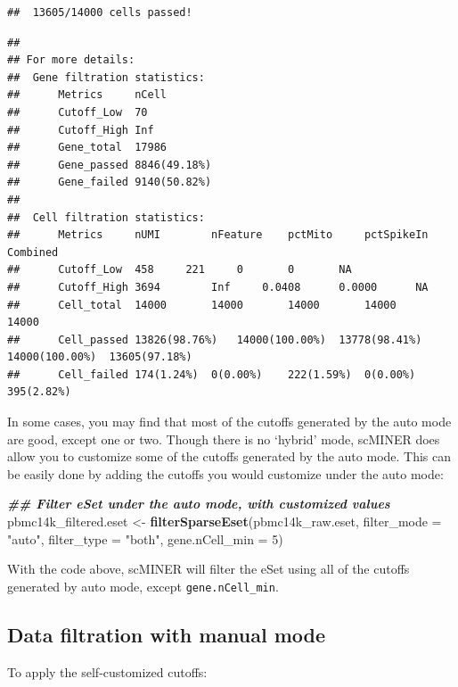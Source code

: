 \documentclass[
  12pt,
]{book}
\newenvironment{Shaded}{\begin{snugshade}}{\end{snugshade}}
\newcommand{\AttributeTok}[1]{\textcolor[rgb]{0.13,0.29,0.53}{#1}}
\newcommand{\DecValTok}[1]{\textcolor[rgb]{0.00,0.00,0.81}{#1}}
\newcommand{\DocumentationTok}[1]{\textcolor[rgb]{0.56,0.35,0.01}{\textbf{\textit{#1}}}}
\newcommand{\FunctionTok}[1]{\textcolor[rgb]{0.13,0.29,0.53}{\textbf{#1}}}
\newcommand{\NormalTok}[1]{#1}
\newcommand{\OtherTok}[1]{\textcolor[rgb]{0.56,0.35,0.01}{#1}}
\newcommand{\StringTok}[1]{\textcolor[rgb]{0.31,0.60,0.02}{#1}}
\begin{document}
\begin{verbatim}
##  13605/14000 cells passed!
\end{verbatim}

\begin{verbatim}
## 
## For more details:
##  Gene filtration statistics:
##      Metrics     nCell
##      Cutoff_Low  70
##      Cutoff_High Inf
##      Gene_total  17986
##      Gene_passed 8846(49.18%)
##      Gene_failed 9140(50.82%)
## 
##  Cell filtration statistics:
##      Metrics     nUMI        nFeature    pctMito     pctSpikeIn  Combined
##      Cutoff_Low  458     221     0       0       NA
##      Cutoff_High 3694        Inf     0.0408      0.0000      NA
##      Cell_total  14000       14000       14000       14000       14000
##      Cell_passed 13826(98.76%)   14000(100.00%)  13778(98.41%)   14000(100.00%)  13605(97.18%)
##      Cell_failed 174(1.24%)  0(0.00%)    222(1.59%)  0(0.00%)    395(2.82%)
\end{verbatim}

In some cases, you may find that most of the cutoffs generated by the auto mode are good, except one or two. Though there is no `hybrid' mode, scMINER does allow you to customize some of the cutoffs generated by the auto mode. This can be easily done by adding the cutoffs you would customize under the auto mode:

\begin{Shaded}
\begin{Highlighting}[]
\DocumentationTok{\#\# Filter eSet under the auto mode, with customized values}
\NormalTok{pbmc14k\_filtered.eset }\OtherTok{\textless{}{-}} \FunctionTok{filterSparseEset}\NormalTok{(pbmc14k\_raw.eset, }\AttributeTok{filter\_mode =} \StringTok{"auto"}\NormalTok{, }\AttributeTok{filter\_type =} \StringTok{"both"}\NormalTok{, }\AttributeTok{gene.nCell\_min =} \DecValTok{5}\NormalTok{)}
\end{Highlighting}
\end{Shaded}

With the code above, scMINER will filter the eSet using all of the cutoffs generated by auto mode, except \texttt{gene.nCell\_min}.

\subsection{Data filtration with manual mode}\label{data-filtration-with-manual-mode}

To apply the self-customized cutoffs:
\end{document}
